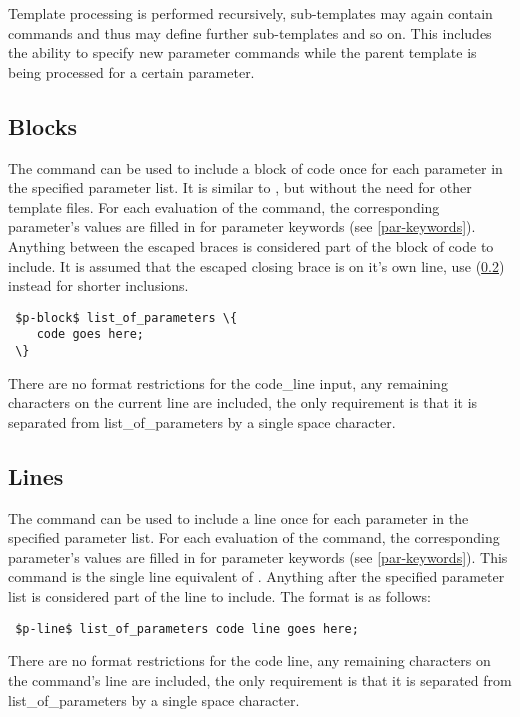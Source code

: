 \documentclass{settings/TU_Delft_Report}
\begin{document}
Template processing is performed recursively, sub-templates may again contain commands and thus may define further sub-templates and so on. This includes the ability to specify new parameter commands while the parent template is being processed for a certain parameter.

\subsection{Blocks} \label{p-block}
The  command can be used to include a block of code once for each parameter in the specified parameter list. It is similar to , but without the need for other template files. For each evaluation of the command, the corresponding parameter's values are filled in for parameter keywords (see \ref{par-keywords}). Anything between the escaped braces is considered part of the block of code to include. It is assumed that the escaped closing brace is on it's own line, use  (\ref{p-line}) instead for shorter inclusions.
\begin{lstlisting}
 $p-block$ list_of_parameters \{ 
    code goes here;
 \}
\end{lstlisting}

There are no format restrictions for the code\_line input, any remaining characters on the current line are included, the only requirement is that it is separated from list\_of\_parameters by a single space character.

\subsection{Lines} \label{p-line}
The  command can be used to include a line once for each parameter in the specified parameter list. For each evaluation of the command, the corresponding parameter's values are filled in for parameter keywords (see \ref{par-keywords}). This command is the single line equivalent of . Anything after the specified parameter list is considered part of the line to include. The format is as follows:
\begin{lstlisting}
 $p-line$ list_of_parameters code line goes here;
\end{lstlisting}

There are no format restrictions for the code line, any remaining characters on the command's line are included, the only requirement is that it is separated from list\_of\_parameters by a single space character.
\end{document}
